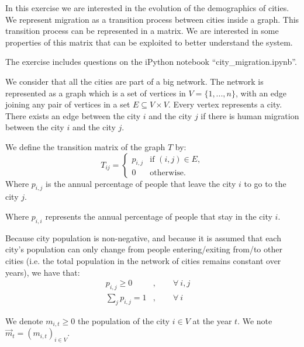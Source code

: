 
In this exercise we are interested in the evolution of the demographics of cities.
We represent migration as a transition process between cities inside a graph.
This transition process can be represented in a matrix.
We are interested in some properties of this matrix that can be exploited to better understand the system.

The exercise includes questions on the iPython notebook ``city\_migration.ipynb''.

We consider that all the cities are part of a big network. 
The network is represented as a graph which is a set of vertices in $V = \{1,...,n\}$, with an edge joining any pair of vertices in a set $E \subseteq V \times V$.
Every vertex represents a city. 
There exists an edge between the city $i$ and the city $j$ if there is human migration between the city $i$ and the city $j$.


We define the transition matrix of the graph $T$ by:
\[
T_{ij} = \left\{ 
\begin{array}{ll}
p_{i,j} & \mbox{if } (i,j) \in E, \\
0 & \mbox{otherwise.}
\end{array}
\right.
\]
Where $p_{i,j}$ is the annual percentage of people that leave the city $i$ to go to the city $j$.

Where $p_{i,i}$ represents the annual percentage of people that stay in the city $i$.

Because city population is non-negative, and because it is assumed that each city's population can only change from people entering/exiting from/to other cities (i.e. the total population in the network of cities remains constant over years), we have that:
\begin{align*}
    p_{i,j}\geq 0 &, \quad \quad \forall\ i,j \\
    \sum\limits_{j} p_{i,j} = 1 &, \quad \quad \forall\ i \quad \quad
\end{align*}

We denote $m_{i,t}\geq 0$ the population of the city $i\in V$ at the year $t$. 
We note $\vec{m}_t = (m_{i,t})_{i\in V}$.

